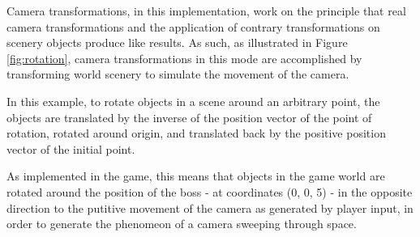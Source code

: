 \documentclass[11pt]{article}
\begin{document}
Camera transformations, in this implementation, work on the principle that real camera
transformations and the application of contrary transformations on scenery objects
produce like results. As such, as illustrated in Figure \ref{fig:rotation}, camera transformations
in this mode are accomplished by transforming world scenery to simulate the movement of the camera.

In this example, to rotate objects in a scene around an arbitrary point, the objects are
translated by the inverse of the position vector of the point of rotation, rotated around
origin, and translated back by the positive position vector of the initial point.

As implemented in the game, this means that objects in the game world are rotated around
the position of the boss - at coordinates (0, 0, 5) - in the opposite direction to the
putitive movement of the camera as generated by player input, in order to generate the
phenomeon of a camera sweeping through space.
\end{document}

